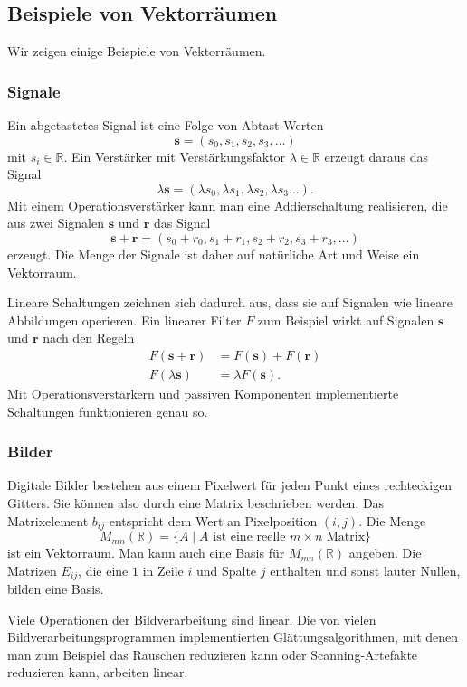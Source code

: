 %
%
\subsection{Beispiele von Vektorräumen}
Wir zeigen einige Beispiele von Vektorräumen.

\subsubsection{Signale}
Ein abgetastetes Signal ist eine Folge von Abtast-Werten 
\[
\bm{s} = (s_0,s_1,s_2,s_3,\dots)
\]
mit $s_i\in\mathbb R$.
Ein Verstärker mit Verstärkungsfaktor $\lambda\in\mathbb R$ erzeugt daraus
das Signal
\[
\lambda\bm{s} = (\lambda s_0,\lambda s_1,\lambda s_2,\lambda s_3\dots).
\]
Mit einem Operationsverstärker kann man eine Addierschaltung realisieren,
die aus zwei Signalen $\boldsymbol{s}$ und $\boldsymbol{r}$ das Signal
\[
\bm{s} + \bm{r}
=
(s_0+r_0,
s_1+r_1,
s_2+r_2,
s_3+r_3,\dots)
\]
erzeugt.
Die Menge der Signale ist daher auf natürliche Art und Weise ein Vektorraum.

Lineare Schaltungen zeichnen sich dadurch aus, dass sie auf Signalen
wie lineare Abbildungen operieren.
Ein linearer Filter $F$ zum Beispiel wirkt auf Signalen
$\bm{s}$ und $\bm{r}$ nach den Regeln
\begin{align*}
F(\bm{s} + \bm{r})&=F(\bm{s}) + F(\bm{r})
\\
F(\lambda \bm{s})&=\lambda F(\bm{s}).
\end{align*}
Mit Operationsverstärkern und passiven Komponenten implementierte
Schaltungen funktionieren genau so.

\subsubsection{Bilder}
Digitale Bilder bestehen aus einem Pixelwert für jeden Punkt eines
rechteckigen Gitters.
Sie können also durch eine Matrix beschrieben werden.
Das Matrixelement $b_{ij}$ entspricht dem Wert an Pixelposition $(i,j)$.
Die Menge
\[
M_{mn}(\mathbb R)
=
\{
A\;|\;
\text{$A$ ist eine reelle $m\times n$ Matrix}
\}
\]
ist ein Vektorraum.
Man kann auch eine Basis für $M_{mn}(\mathbb R)$ angeben.
Die Matrizen $E_{ij}$, die eine $1$ in Zeile $i$ und Spalte $j$
enthalten und sonst lauter Nullen, bilden eine Basis.

Viele Operationen der Bildverarbeitung sind linear.
Die von vielen Bildverarbeitungsprogrammen implementierten
Glättungsalgorithmen, mit denen man zum Beispiel das Rauschen reduzieren
kann oder Scanning-Artefakte reduzieren kann, arbeiten linear.

